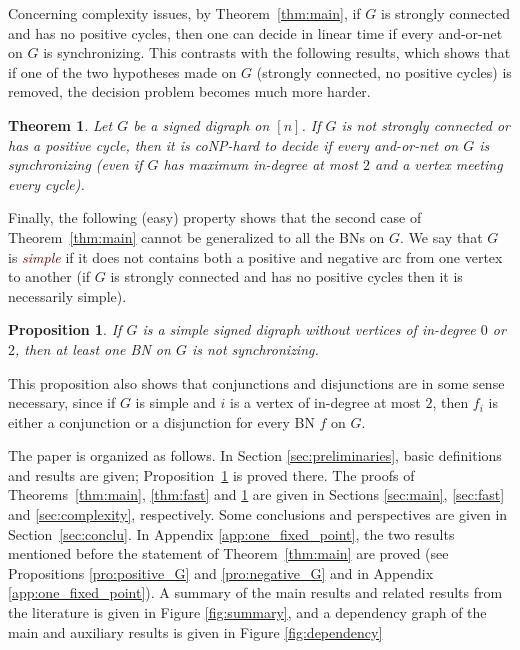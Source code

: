 \documentclass[11pt,letter]{article}
\newtheorem{proposition}{Proposition}
\newtheorem{theorem}{Theorem}
\newcommand{\EM}[1]{{\em\textcolor{Maroon}{#1}}}
\begin{document}
Concerning complexity issues, by Theorem~\ref{thm:main}, if $G$ is strongly connected and has no positive cycles, then one can decide in linear time if every and-or-net on $G$ is synchronizing. This contrasts with the following results, which shows that if one of the two hypotheses made on $G$ (strongly connected, no positive cycles) is removed, the decision problem becomes much more harder. 

\begin{theorem}\label{thm:complexity}
Let $G$ be a signed digraph on $[n]$. If $G$ is not strongly connected or has a positive cycle, then it is coNP-hard to decide if every and-or-net on $G$ is synchronizing (even if $G$ has maximum in-degree at most $2$ and a vertex meeting every cycle). 
\end{theorem}

Finally, the following (easy) property shows that the second case of Theorem~\ref{thm:main} cannot be generalized to all the BNs on $G$. We say that $G$ is \EM{simple} if it does not contains both a positive and negative arc from one vertex to another (if $G$ is strongly connected and has no positive cycles then it is necessarily simple).  

\begin{proposition}\label{pro:02}
If $G$ is a simple signed digraph without vertices of in-degree $0$ or $2$, then at least one BN on $G$ is not synchronizing.
\end{proposition}  

This proposition also shows that conjunctions and disjunctions are in some sense necessary, since if $G$ is simple and $i$ is a vertex of in-degree at most $2$, then $f_i$ is either a conjunction or a disjunction for every BN $f$ on $G$.

\medskip
The paper is organized as follows. In Section \ref{sec:preliminaries}, basic definitions and results are given; Proposition~\ref{pro:02} is proved there. The proofs of Theorems~\ref{thm:main}, \ref{thm:fast} and \ref{thm:complexity} are given in Sections \ref{sec:main}, \ref{sec:fast} and \ref{sec:complexity}, respectively. Some conclusions and perspectives are given in Section~\ref{sec:conclu}. In Appendix \ref{app:one_fixed_point}, the two results mentioned before the statement of Theorem~\ref{thm:main} are proved (see  Propositions \ref{pro:positive_G} and \ref{pro:negative_G} and in Appendix \ref{app:one_fixed_point}). A summary of the main results and related results from the literature is given in Figure \ref{fig:summary}, and a dependency graph of the main and auxiliary results is given in Figure \ref{fig:dependency}
\end{document}
